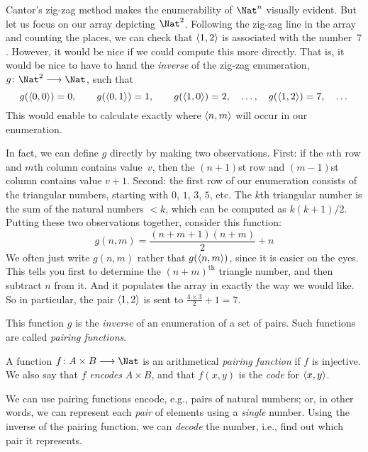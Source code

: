 \documentclass[../../../include/open-logic-section]{subfiles}
\begin{document}

\begin{explain}
Cantor's zig-zag method makes the enumerability of $\Nat^n$ visually
evident. But let us focus on our array depicting $\Nat^2$. Following
the zig-zag line in the array and counting the places, we can check
that $\langle 1,2 \rangle$ is associated with the number~$7$. However, it would
be nice if we could compute this more directly. That is, it would be
nice to have to hand the \emph{inverse} of the zig-zag enumeration,
$g\colon \Nat^2 \to \Nat$, such that
\[
g(\langle 0,0 \rangle) = 0, \qquad
g(\langle 0,1 \rangle) = 1, \qquad
g(\langle 1,0 \rangle) = 2, \quad \dots, \quad 
g(\langle 1,2 \rangle) = 7, \quad\dots
\]
This would enable to calculate exactly where $\langle n, m \rangle$ will occur
in our enumeration. 

In fact, we can define $g$ directly by making two observations. First:
if the $n$th row and $m$th column contains value~$v$, then the
$(n+1)$st row and $(m-1)$st column contains value $v + 1$. Second: the
first row of our enumeration consists of the triangular numbers,
starting with $0$, $1$, $3$, $5$, etc. The $k$th triangular number is
the sum of the natural numbers $< k$, which can be computed as
$k(k+1)/2$. Putting these two observations together, consider this
function:
\[
  g(n,m) = \frac{(n+m+1)(n+m)}{2} + n
\]
We often just write $g(n, m)$ rather that $g(\langle n, m \rangle)$, since it
is easier on the eyes. This tells you first to determine the
$(n+m)^\text{th}$ triangle number, and then subtract $n$ from it. And
it populates the array in exactly the way we would like. So in
particular, the pair $\langle 1, 2 \rangle$ is sent to $\frac{4 \times 3}{2} +
1 = 7$. 

This function $g$ is the \emph{inverse} of an enumeration of a set of
pairs. Such functions are called \emph{pairing functions}.
\end{explain}

\begin{defn} 
  A function $f\colon A \times B \to \Nat$ is an arithmetical
  \emph{pairing function} if $f$ is injective. We also say that $f$
  \emph{encodes} $A \times B$, and that $f(x,y)$ is the
  \emph{code} for $\langle x,y \rangle$.
\end{defn}

\begin{explain}
We can use pairing functions encode, e.g., pairs of natural numbers;
or, in other words, we can represent each \emph{pair} of elements
using a \emph{single} number. Using the inverse of the pairing
function, we can \emph{decode} the number, i.e., find out which
pair it represents.
\end{explain}
\end{document}
